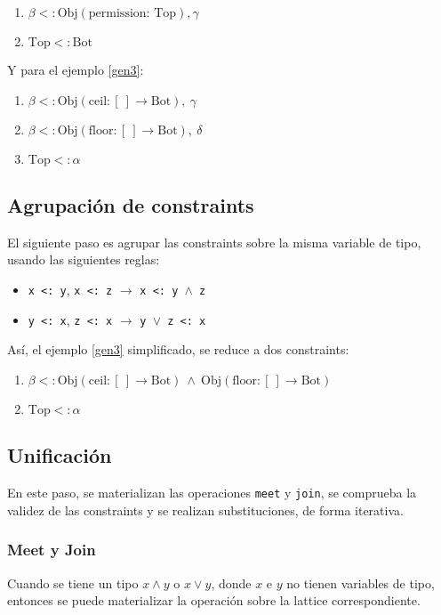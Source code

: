 \begin{enumerate}
  \item $\beta <:\text{Obj}(\text{permission: }\text{Top}), \gamma$
  \item $\text{Top} <: \text{Bot}$
\end{enumerate}

Y para el ejemplo \ref{gen3}:

\begin{enumerate}
  \item $\beta <: \text{Obj}(\text{ceil}: [\ ] \rightarrow \text{Bot}),\ \gamma$
  \item $\beta <: \text{Obj}(\text{floor}: [\ ] \rightarrow \text{Bot}),\ \delta$
  \item $\text{Top} <: \alpha$
\end{enumerate}
\subsection{Agrupación de constraints}
El siguiente paso es agrupar las constraints sobre la misma variable de tipo, usando las siguientes reglas:

\begin{itemize}
  \item \texttt{x <: y}, \texttt{x <: z} $\rightarrow$ \texttt{x <: y }$\wedge$\texttt{ z}
  \item \texttt{y <: x}, \texttt{z <: x} $\rightarrow$ \texttt{y }$\vee$\texttt{ z <: x}
\end{itemize}

Así, el ejemplo \ref{gen3} simplificado, se reduce a dos constraints:

\begin{enumerate}
  \item $\beta <: \text{Obj}(\text{ceil}: [\ ] \rightarrow \text{Bot})\ \wedge\ \text{Obj}(\text{floor}: [\ ] \rightarrow \text{Bot})$
  \item $\text{Top} <: \alpha$
\end{enumerate}


\subsection{Unificación}
En este paso, se materializan las operaciones \texttt{meet} y \texttt{join}, se comprueba la validez de las constraints y se realizan substituciones, de forma iterativa.

\subsubsection{Meet y Join}
Cuando se tiene un tipo $x \wedge y$ o $x \vee y$, donde $x$ e $y$ no tienen variables de tipo, entonces se puede materializar la operación sobre la lattice correspondiente.

